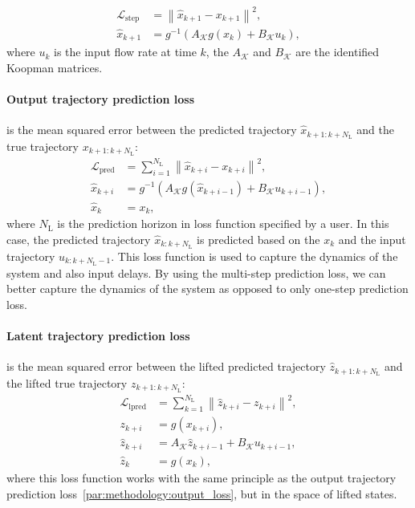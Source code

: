 \documentclass[conference]{IEEEtran}
\newcommand{\ui}[2]{#1_{\text{#2}}}  %
\begin{document}
\begin{subequations}
    \begin{align}
        \mathcal{L}_{\text{step}} & = \left \|\hat{x}_{k+1} - x_{k+1}\right \|^2,     \\
        \hat{x}_{k+1}             & = g^{-1}(A_\mathcal{K}g(x_k) + B_\mathcal{K}u_k),
    \end{align}
\end{subequations}
where \(u_k\) is the input flow rate at time \(k\), the \(A_\mathcal{K}\) and \(B_\mathcal{K}\) are the identified Koopman matrices.

\paragraph*{Output trajectory prediction loss}\label{par:methodology:output_loss}
is the mean squared error between the predicted trajectory \(\hat{x}_{k+1:k+\ui{N}{L}}\) and the true trajectory \(x_{k+1:k+\ui{N}{L}}\):
\begin{subequations}
    \begin{align}
        \mathcal{L}_{\text{pred}} & = \sum_{i=1}^{\ui{N}{L}}\left \|\hat{x}_{k+i} - x_{k+i}\right \|^2,                    \\
        \hat{x}_{k+i}             & = g^{-1}\left(A_\mathcal{K}g(\hat{x}_{k+i-1}) + B_\mathcal{K}u_{k+i-1}\right), \\
        \hat{x}_{k}               & = x_{k},
    \end{align}
\end{subequations}
where \(\ui{N}{L}\) is the prediction horizon in loss function specified by a user. In this case, the predicted trajectory \(\hat{x}_{k:k+\ui{N}{L}}\) is predicted based on the \(x_k\) and the input trajectory \(u_{k:k+\ui{N}{L}-1}\). This loss function is used to capture the dynamics of the system and also input delays. By using the multi-step prediction loss, we can better capture the dynamics of the system as opposed to only one-step prediction loss.

\paragraph*{Latent trajectory prediction loss}
is the mean squared error between the lifted predicted trajectory \(\hat{z}_{k+1:k+\ui{N}{L}}\) and the lifted true trajectory \(z_{k+1:k+\ui{N}{L}}\):
\begin{subequations}
    \begin{align}
        \mathcal{L}_{\text{lpred}} & = \sum_{k=1}^{\ui{N}{L}}\left \|\hat{z}_{k+i} - z_{k+i}\right \|^2, \\
        z_{k+i}                    & = g(x_{k+i}),                                               \\
        \hat{z}_{k+i}              & = A_{\mathcal{K}}\hat{z}_{k+i-1}+B_{\mathcal{K}}u_{k+i-1},  \\
        \hat{z}_{k}                & = g(x_{k}),
    \end{align}
\end{subequations}
where this loss function works with the same principle as the output trajectory prediction loss~\ref{par:methodology:output_loss}, but in the space of lifted states.
\end{document}
